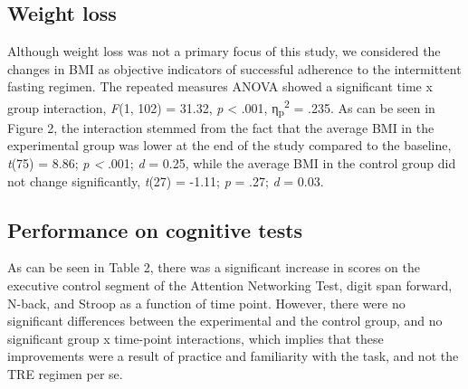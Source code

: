 \documentclass[authordate, empirical]{jote-new-article}
\begin{document}
\subsection{Weight loss}



Although weight loss was not a primary focus of this study, we considered the changes in BMI as objective indicators of successful adherence to the intermittent fasting regimen. The repeated measures ANOVA showed a significant time x group interaction, \emph{F}(1, 102) = 31.32, \emph{p} < .001, η\textsubscript{p}\textsuperscript{2} = .235. As can be seen in Figure 2, the interaction stemmed from the fact that the average BMI in the experimental group was lower at the end of the study compared to the baseline, \emph{t}(75) = 8.86; \emph{p < }.001; \emph{d} = 0.25, while the average BMI in the control group did not change significantly, \emph{t}(27) = -1.11; \emph{p }= .27; \emph{d} = 0.03.








\subsection{Performance on cognitive tests}



As can be seen in Table 2, there was a significant increase in scores on the executive control segment of the Attention Networking Test, digit span forward, N-back, and Stroop as a function of time point. However, there were no significant differences between the experimental and the control group, and no significant group x time-point interactions, which implies that these improvements were a result of practice and familiarity with the task, and not the TRE regimen per se.
\end{document}
